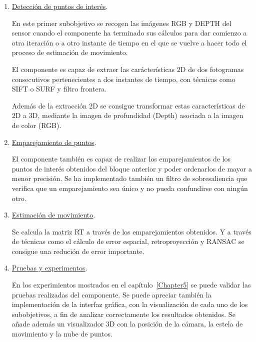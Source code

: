 \begin{enumerate}
 
\item \underline{Detección de puntos de interés}.

En este primer subobjetivo se recogen las imágenes RGB y DEPTH del sensor cuando el componente ha terminado sus cálculos para dar comienzo a otra iteración o a otro instante de tiempo en el que se vuelve a hacer todo el proceso de estimación de movimiento.

El componente es capaz de extraer las carácterísticas 2D de dos fotogramas consecutivos pertenecientes a dos instantes de tiempo, con técnicas como SIFT o SURF y filtro frontera.

Además de la extracción 2D se consigue transformar estas características de 2D a 3D, mediante la imagen de profundidad (Depth) asociada a la imagen de color (RGB).

\item \underline{Emparejamiento de puntos}.

El componente también es capaz de realizar los emparejamientos de los puntos de interés obtenidos del bloque anterior y poder ordenarlos de mayor a menor precisión. Se ha implementado también un filtro de sobresaliencia que verifica que un emparejamiento sea único y no pueda confundirse con ningún otro.

\item \underline{Estimación de movimiento}.

Se calcula la matriz RT a través de los emparejamientos obtenidos. Y a través de técnicas como el cálculo de error espacial, retroproyección y RANSAC se consigue una redución de error importante.

\item \underline{Pruebas y experimentos}.

En los experimientos mostrados en el capítulo~\ref{Chapter5} se puede validar las pruebas realizadas del componente. Se puede apreciar también la implementación de la interfaz gráfica, con la visualización de cada uno de los subobjetivos, a fin de analizar correctamente los resultados obtenidos. Se añade además un visualizador 3D con la posición de la cámara, la estela de movimiento y la nube de puntos.

\end{enumerate}




